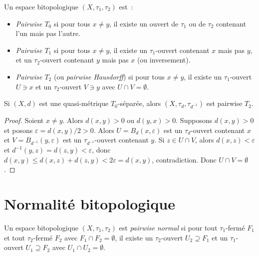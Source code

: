 \begin{definition}
Un espace bitopologique $(X, \tau_1, \tau_2)$ est~:
\begin{itemize}
  \item \emph{Pairwise $T_0$} si pour tous $x \neq y$, il existe un ouvert de $\tau_1$ ou
    de $\tau_2$ contenant l'un mais pas l'autre.
  \item \emph{Pairwise $T_1$} si pour tous $x \neq y$, il existe un $\tau_1$-ouvert
    contenant $x$ mais pas $y$, et un $\tau_2$-ouvert contenant $y$ mais pas $x$ (ou
    inversement).
  \item \emph{Pairwise $T_2$} (ou \emph{pairwise Hausdorff}) si pour tous $x \neq y$, il
    existe un $\tau_1$-ouvert $U \ni x$ et un $\tau_2$-ouvert $V \ni y$ avec
    $U \cap V = \emptyset$.
\end{itemize}
\end{definition}

\begin{theoreme}
Si $(X,d)$ est une quasi-m\'etrique $T_0$-s\'epar\'ee, alors $(X,\tau_d, \tau_{d^{-1}})$
est pairwise $T_2$.
\end{theoreme}

\begin{proof}
Soient $x \neq y$. Alors $d(x,y) > 0$ ou $d(y,x) > 0$. Supposons $d(x,y) > 0$ et posons
$\varepsilon = d(x,y)/2 > 0$. Alors $U = B_d(x,\varepsilon)$ est un $\tau_d$-ouvert
contenant $x$ et $V = B_{d^{-1}}(y,\varepsilon)$ est un $\tau_{d^{-1}}$-ouvert contenant
$y$. Si $z \in U \cap V$, alors $d(x,z) < \varepsilon$ et $d^{-1}(y,z) = d(z,y) <
\varepsilon$, donc $d(x,y) \leq d(x,z) + d(z,y) < 2\varepsilon = d(x,y)$, contradiction.
Donc $U \cap V = \emptyset$.
\end{proof}

\section{Normalit\'e bitopologique}

\begin{definition}
Un espace bitopologique $(X,\tau_1,\tau_2)$ est \emph{pairwise normal} si pour tout
$\tau_1$-ferm\'e $F_1$ et tout $\tau_2$-ferm\'e $F_2$ avec $F_1 \cap F_2 = \emptyset$,
il existe un $\tau_2$-ouvert $U_2 \supseteq F_1$ et un $\tau_1$-ouvert $U_1 \supseteq F_2$
avec $U_1 \cap U_2 = \emptyset$.
\end{definition}

